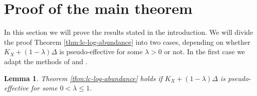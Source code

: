 \documentclass[12pt]{amsart}
\newcommand{\<}{\leq}
\newtheorem{lemma}[theorem]{Lemma}
\theoremstyle{remark}
\theoremstyle{definition}
\theoremstyle{definition}
\numberwithin{equation}{section}
\theoremstyle{definition}
\theoremstyle{definition}
\begin{document}
\section{Proof of the main theorem}
In this section we will prove the results stated in the introduction.  
We will divide the proof Theorem \ref{thm:lc-log-abundance} into two cases,  depending on whether $K_X+(1-\lambda)\Delta$ is pseudo-effective for some $\lambda>0$ or not.
In the first case we adapt the methods of \cite[Chapter 14]{Kol92} and \cite[Section 8.B]{CHP16}. 

\begin{lemma}
    \label{lemma:main-thm-1}
 Theorem \ref{thm:lc-log-abundance} holds if  $K_X+(1-\lambda)\Delta$ is pseudo-effective for some $0<\lambda \< 1$. 
\end{lemma}
\end{document}
